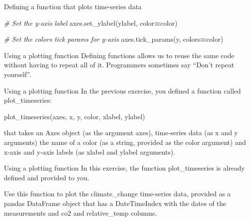 \documentclass[
  ignorenonframetext,
]{beamer}
\newenvironment{Shaded}{\begin{snugshade}}{\end{snugshade}}
\newcommand{\CommentTok}[1]{\textcolor[rgb]{0.56,0.35,0.01}{\textit{#1}}}
\newcommand{\NormalTok}[1]{#1}
\newcommand{\OperatorTok}[1]{\textcolor[rgb]{0.81,0.36,0.00}{\textbf{#1}}}
\newcommand{\StringTok}[1]{\textcolor[rgb]{0.31,0.60,0.02}{#1}}
\begin{document}
\begin{frame}[fragile]{Defining a function that plots time-series data}
\label{defining-a-function-that-plots-time-series-data-3}

\begin{Shaded}
\begin{Highlighting}[]

  \CommentTok{\# Set the y{-}axis label}
\NormalTok{  axes.set\_ylabel(ylabel, color}\OperatorTok{=}\NormalTok{color)}

  \CommentTok{\# Set the colors tick params for y{-}axis}
\NormalTok{  axes.tick\_params(}\StringTok{\textquotesingle{}y\textquotesingle{}}\NormalTok{, colors}\OperatorTok{=}\NormalTok{color)}
\end{Highlighting}
\end{Shaded}
\end{frame}

\begin{frame}{Using a plotting function}
\label{using-a-plotting-function}
Defining functions allows us to reuse the same code without having to
repeat all of it. Programmers sometimes say ``Don't repeat yourself''.
\end{frame}

\begin{frame}[fragile]{Using a plotting function}
\label{using-a-plotting-function-1}
In the previous exercise, you defined a function called
plot\_timeseries:


\begin{Shaded}
\begin{Highlighting}[]
\NormalTok{plot\_timeseries(axes, x, y, color, xlabel, ylabel)}
\end{Highlighting}
\end{Shaded}

that takes an Axes object (as the argument axes), time-series data (as x
and y arguments) the name of a color (as a string, provided as the color
argument) and x-axis and y-axis labels (as xlabel and ylabel arguments).
\end{frame}

\begin{frame}{Using a plotting function}
\label{using-a-plotting-function-2}
In this exercise, the function plot\_timeseries is already defined and
provided to you.

Use this function to plot the climate\_change time-series data, provided
as a pandas DataFrame object that has a DateTimeIndex with the dates of
the measurements and co2 and relative\_temp columns.
\end{frame}
\end{document}
